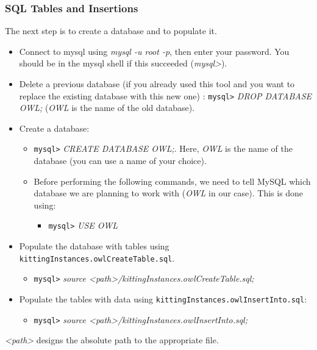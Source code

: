 \documentclass[12pt]{article}
\begin{document}
\subsubsection{SQL Tables and Insertions}
The next step is to create a database and to populate it.

\begin{itemize}
\item Connect to mysql using \textit{mysql -u root -p}, then enter your password. You should be in the mysql shell if this succeeded (\textit{mysql>}). 
\item Delete a previous database (if you already used this tool and you want to replace the existing database with this new one) : 
\texttt{mysql>} \textit{DROP DATABASE OWL;} (\textit{OWL} is the name of the old database).
\item Create a database: 
\begin{itemize}
\item \texttt{mysql>} \textit{CREATE DATABASE OWL;}. Here, \textit{OWL} is the name of the database (you can use a name of your choice).
\item Before performing the following commands, we need to tell MySQL which database we are planning to work with (\textit{OWL} in our case). This is done using:
\begin{itemize}
\item[] \texttt{mysql>} \textit{USE OWL}
\end{itemize} 
\end{itemize} 
\item Populate the database with tables using \texttt{kittingInstances.owlCreateTable.sql}. 
\begin{itemize}
 \item \texttt{mysql>} \textit{source <path>/kittingInstances.owlCreateTable.sql;}
\end{itemize} 
 
\item Populate the tables with data using \texttt{kittingInstances.owlInsertInto.sql}: 
\begin{itemize}
 \item \texttt{mysql>} \textit{source <path>/kittingInstances.owlInsertInto.sql;}
\end{itemize} 
\end{itemize} 

\textit{<path>} designs the absolute path to the appropriate file.
\end{document}
